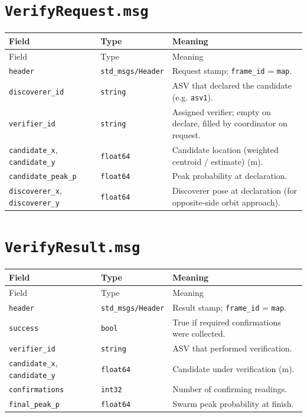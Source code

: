 \section{\texttt{VerifyRequest.msg}}


\begin{center}
\small
\begin{longtable}{@{}llp{7.2cm}@{}}
\toprule
Field & Type & Meaning \\
\midrule
\endfirsthead
\toprule
Field & Type & Meaning \\
\midrule
\endhead
\texttt{header} & \texttt{std\_msgs/Header} & Request stamp; \texttt{frame\_id} = \texttt{map}. \\
\texttt{discoverer\_id} & \texttt{string} & ASV that declared the candidate (e.g. \texttt{asv1}). \\
\texttt{verifier\_id} & \texttt{string} & Assigned verifier; empty on declare, filled by coordinator on request. \\
\texttt{candidate\_x}, \texttt{candidate\_y} & \texttt{float64} & Candidate location (weighted centroid / estimate) (m). \\
\texttt{candidate\_peak\_p} & \texttt{float64} & Peak probability at declaration. \\
\texttt{discoverer\_x}, \texttt{discoverer\_y} & \texttt{float64} & Discoverer pose at declaration (for opposite-side orbit approach). \\
\bottomrule
\end{longtable}
\end{center}


\section{\texttt{VerifyResult.msg}}


\begin{center}
\small
\begin{longtable}{@{}llp{7.2cm}@{}}
\toprule
Field & Type & Meaning \\
\midrule
\endfirsthead
\toprule
Field & Type & Meaning \\
\midrule
\endhead
\texttt{header} & \texttt{std\_msgs/Header} & Result stamp; \texttt{frame\_id} = \texttt{map}. \\
\texttt{success} & \texttt{bool} & True if required confirmations were collected. \\
\texttt{verifier\_id} & \texttt{string} & ASV that performed verification. \\
\texttt{candidate\_x}, \texttt{candidate\_y} & \texttt{float64} & Candidate under verification (m). \\
\texttt{confirmations} & \texttt{int32} & Number of confirming readings. \\
\texttt{final\_peak\_p} & \texttt{float64} & Swarm peak probability at finish. \\
\bottomrule
\end{longtable}
\end{center}




